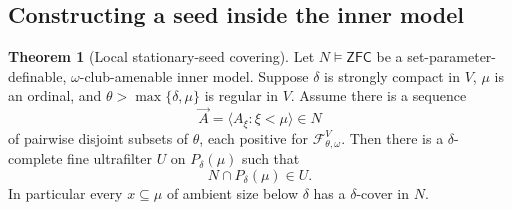 \documentclass[11pt,letterpaper]{article}
\theoremstyle{definition}
\newtheorem{theorem}[definition]{Theorem}
\numberwithin{equation}{section}
\newcommand{\ZFC}{\mathsf{ZFC}}
\newcommand{\calF}{\mathcal F}
\begin{document}
\subsection{Constructing a seed inside the inner model}

\begin{theorem}[Local stationary-seed covering]\label{thm:localseed}
Let $N\models\ZFC$ be a set-parameter-definable, $\omega$-club-amenable
inner model. Suppose $\delta$ is strongly compact in $V$,
$\mu$ is an ordinal, and $\theta>\max\{\delta,\mu\}$ is regular in $V$.
Assume there is a sequence
\[
\vec A=\langle A_\xi:\xi<\mu\rangle\in N
\]
of pairwise disjoint subsets of $\theta$, each positive for
$\calF^V_{\theta,\omega}$. Then there is a $\delta$-complete fine
ultrafilter $U$ on $P_\delta(\mu)$ such that
\begin{equation}\label{eq:concentrates}
N\cap P_\delta(\mu)\in U.
\end{equation}
In particular every $x\subseteq\mu$ of ambient size below $\delta$
has a $\delta$-cover in $N$.
\end{theorem}
\end{document}
